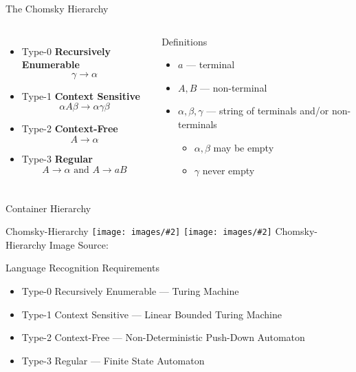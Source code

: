 \documentclass[]{beamer}
\makeatletter
\newcommand{\image}[3][\@nil]{%
        \def\tmp{#1}%
        \begin{center}
        \ifx\tmp\@nnil
            \texttt{[image: images/\#2]}
        \else
            \texttt{[image: images/\#2]}
            \linebreak
            #1
        \fi
        \linebreak
        {\tiny Image Source:\thinspace{\tiny #3}}
        \end{center}
}
\makeatother
\begin{document}
\begin{frame}{The Chomsky Hierarchy}
\begin{columns}
\begin{itemize}
    \item Type-0 {\bf Recursively Enumerable}
    \[
        \gamma \rightarrow \alpha
    \]
    \item Type-1 {\bf Context Sensitive}
    \[
    \alpha A \beta \rightarrow \alpha \gamma \beta
    \]
    \item Type-2 {\bf Context-Free}
    \[
    A \rightarrow \alpha
    \]
    \item Type-3 {\bf Regular}
    \[
    A \rightarrow \alpha \textrm{ and }
    A \rightarrow aB
    \]
\end{itemize}
    \begin{block}{Definitions}
        \begin{itemize}
            \item $a$ --- terminal
            \item $A,B$ --- non-terminal
            \item $\alpha, \beta, \gamma$ --- string of terminals and/or non-terminals
            \begin{itemize}
                \item $\alpha,\beta$ may be empty
                \item $\gamma$ never empty
            \end{itemize}
        \end{itemize}
    \end{block}

\end{columns}
\end{frame}

\begin{frame}{Container Hierarchy}
\image[Chomsky-Hierarchy]{chomsky-hierarchy}{Wikipedia}
\end{frame}

\begin{frame}{Language Recognition Requirements}
    \begin{itemize}
        \item Type-0 Recursively Enumerable --- Turing Machine
        \item Type-1 Context Sensitive --- Linear Bounded Turing Machine
        \item Type-2 Context-Free --- Non-Deterministic Push-Down Automaton
        \item Type-3 Regular --- Finite State Automaton
    \end{itemize}
\end{frame}
\end{document}

